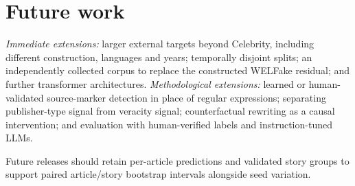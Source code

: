\section{Future work}
\emph{Immediate extensions:} larger external targets beyond Celebrity, including different construction, languages and years; temporally disjoint splits; an independently collected corpus to replace the constructed WELFake residual; and further transformer architectures. \emph{Methodological extensions:} learned or human-validated source-marker detection in place of regular expressions; separating publisher-type signal from veracity signal; counterfactual rewriting as a causal intervention; and evaluation with human-verified labels and instruction-tuned LLMs.



Future releases should retain per-article predictions and validated story groups to support paired article/story bootstrap intervals alongside seed variation.

